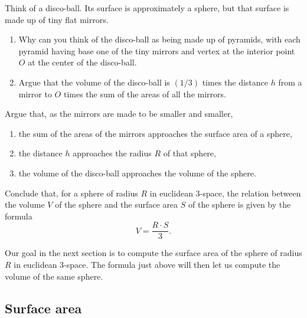 \documentclass{ximera}
\begin{document}
Think of a disco-ball. Its surface is approximately a sphere, but that surface
is made up of tiny flat mirrors.

\begin{exercise}\hfil
\begin{enumerate}
\item Why can you think of the disco-ball as being made up of
pyramids, with each pyramid having base one of the tiny mirrors and vertex at
the interior point $O$ at the center of the disco-ball.
\item Argue that the volume of the disco-ball is $\left(  1/3\right)  $ times the
distance $h$ from a mirror to $O$ times the sum of the areas of all the mirrors.
\end{enumerate}
\end{exercise}

\begin{exercise}
Argue that, as the mirrors are made to be smaller and smaller,
\begin{enumerate}
\item the sum of the areas of the mirrors approaches the surface area of a sphere,
\item the distance $h$ approaches the radius $R$ of that sphere,
\item the volume of the disco-ball approaches the volume of the sphere.
\end{enumerate}
Conclude that, for a sphere of radius $R$ in euclidean $3$-space, the relation
between the volume $V$ of the sphere and the surface area $S$ of the sphere is
given by the formula%
\[
V=\frac{R\cdot S}{3}.
\]
\end{exercise}

Our goal in the next section is to compute the surface area of the sphere
of radius $R$ in euclidean $3$-space. The formula just above will then let us
compute the volume of the same sphere.

\subsection*{Surface area}
\end{document}
